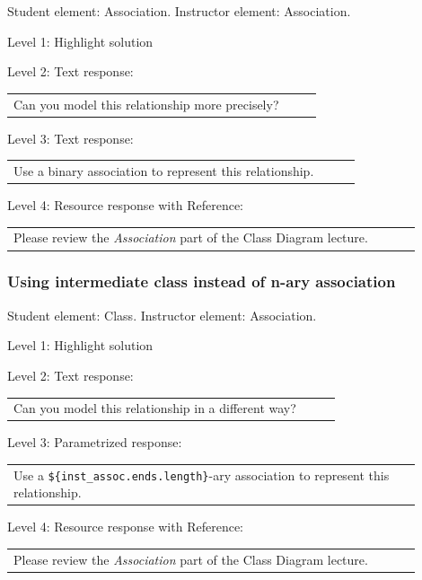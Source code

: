 Student element: Association. Instructor element: Association. \medskip

\noindent Level 1: Highlight solution  \medskip

\noindent Level 2: Text response: \medskip

\begin{tabular}{|p{0.9\linewidth}}
Can you model this relationship more precisely?
\end{tabular} \medskip

\noindent Level 3: Text response: \medskip

\begin{tabular}{|p{0.9\linewidth}}
Use a binary association to represent this relationship.
\end{tabular} \medskip

\noindent Level 4: Resource response with Reference: \medskip

\begin{tabular}{|p{0.9\linewidth}}
Please review the \textit{Association} part of the Class Diagram lecture.
\end{tabular} \medskip


\subsubsection{Using intermediate class instead of n-ary association}

Student element: Class. Instructor element: Association. \medskip

\noindent Level 1: Highlight solution  \medskip

\noindent Level 2: Text response: \medskip

\begin{tabular}{|p{0.9\linewidth}}
Can you model this relationship in a different way?
\end{tabular} \medskip

\noindent Level 3: Parametrized response: \medskip

\begin{tabular}{|p{0.9\linewidth}}
Use a \verb|${inst_assoc.ends.length}|-ary association to represent this relationship.
\end{tabular} \medskip

\noindent Level 4: Resource response with Reference: \medskip

\begin{tabular}{|p{0.9\linewidth}}
Please review the \textit{Association} part of the Class Diagram lecture.
\end{tabular} \medskip


